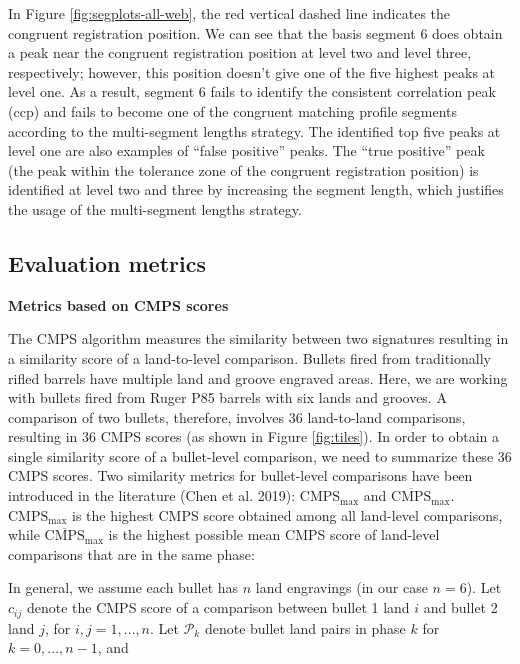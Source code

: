 In Figure \ref{fig:segplots-all-web}, the red vertical dashed line indicates the congruent registration position.
We can see that the basis segment 6 does obtain a peak near the congruent registration position at level two and level three, respectively; however, this position doesn't give one of the five highest peaks at level one.
As a result, segment 6 fails to identify the consistent correlation peak (ccp) and fails to become one of the congruent matching profile segments according to the multi-segment lengths strategy.
The identified top five peaks at level one are also examples of ``false positive'' peaks.
The ``true positive'' peak (the peak within the tolerance zone of the congruent registration position) is identified at level two and three by increasing the segment length, which justifies the usage of the multi-segment lengths strategy.

\hypertarget{evaluation-metrics}{%
\subsection{Evaluation metrics}\label{evaluation-metrics}}

\textbf{Metrics based on CMPS scores}

The CMPS algorithm measures the similarity between two signatures resulting in a similarity score of a land-to-level comparison.
Bullets fired from traditionally rifled barrels have multiple land and groove engraved areas.
Here, we are working with bullets fired from Ruger P85 barrels with six lands and grooves.
A comparison of two bullets, therefore, involves 36 land-to-land comparisons, resulting in 36 CMPS scores (as shown in Figure \ref{fig:tiles}).
In order to obtain a single similarity score of a bullet-level comparison, we need to summarize these 36 CMPS scores.
Two similarity metrics for bullet-level comparisons have been introduced in the literature (Chen et al. 2019): \(\mathrm{CMPS_{max}}\) and \(\mathrm{\overline{CMPS}_{max}}\).
\(\mathrm{CMPS_{max}}\) is the highest CMPS score obtained among all land-level comparisons, while \(\mathrm{\overline{CMPS}_{max}}\) is the highest possible mean CMPS score of land-level comparisons that are in the same phase:

In general, we assume each bullet has \(n\) land engravings (in our case \(n=6\)).
Let \(c_{ij}\) denote the CMPS score of a comparison between bullet 1 land \(i\) and bullet 2 land \(j\), for \(i,j = 1, \dots, n\).
Let \(\mathcal{P}_k\) denote bullet land pairs in phase \(k\) for \(k = 0, \dots, n-1\), and

